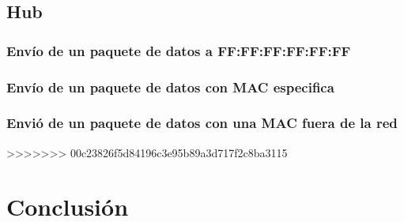 \documentclass[spanish]{udpreport}
\begin{document}
\section{Hub}

\subsection{Envío de un paquete de datos a FF:FF:FF:FF:FF:FF}

\subsection{Envío de un paquete de datos con MAC especifica}

\subsection{Envió de un paquete de datos con una MAC fuera de la red}
>>>>>>> 00c23826f5d84196c3e95b89a3d717f2c8ba3115




\chapter{Conclusión}

\end{document}
